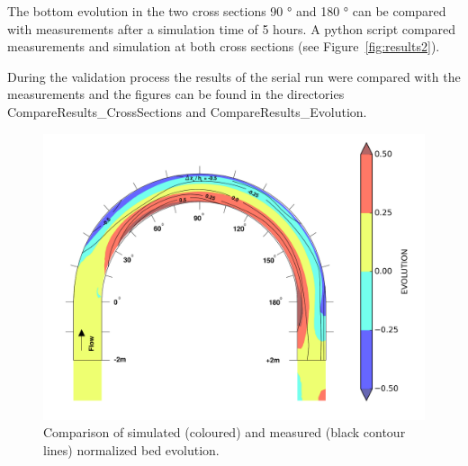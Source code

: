 The bottom evolution in the two cross sections 90 ° and 180 ° can be compared with measurements
after a simulation time of 5 hours. 
A python script compared measurements and simulation at both cross sections (see Figure~\ref{fig:results2}).

During the validation process the results of the serial run were compared with the measurements and the figures can be found in the directories
CompareResults_CrossSections and CompareResults_Evolution. 

\begin{figure} [!h]
\centering
\includegraphics[scale=0.15, bb=0 0 30 30]{img/EvolutionR05.png}
 \caption{Comparison of simulated (coloured) and measured (black contour lines) normalized bed evolution.}\label{fig:results1}
\end{figure}

